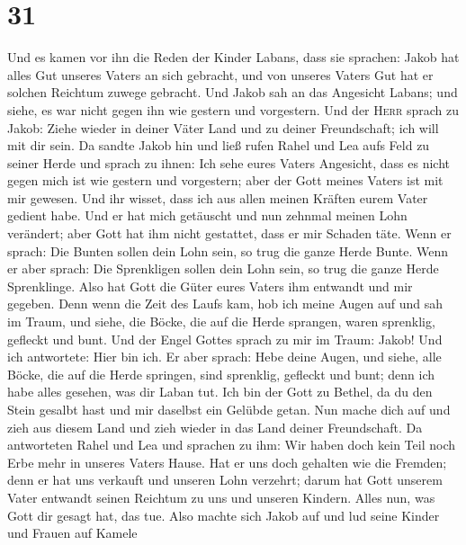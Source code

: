 \hypertarget{section-30}{%
\section{31}\label{section-30}}

 Und es kamen vor ihn die Reden der Kinder Labans, dass
sie sprachen: Jakob hat alles Gut unseres Vaters an sich gebracht, und
von unseres Vaters Gut hat er solchen Reichtum zuwege gebracht.
 Und Jakob sah an das Angesicht Labans; und siehe, es war
nicht gegen ihn wie gestern und vorgestern.  Und der
\textsc{Herr} sprach zu Jakob: Ziehe wieder in deiner Väter Land und zu
deiner Freundschaft; ich will mit dir sein.  Da sandte
Jakob hin und ließ rufen Rahel und Lea aufs Feld zu seiner Herde
 und sprach zu ihnen: Ich sehe eures Vaters Angesicht,
dass es nicht gegen mich ist wie gestern und vorgestern; aber der Gott
meines Vaters ist mit mir gewesen.  Und ihr wisset, dass
ich aus allen meinen Kräften eurem Vater gedient habe. 
Und er hat mich getäuscht und nun zehnmal meinen Lohn verändert; aber
Gott hat ihm nicht gestattet, dass er mir Schaden täte. 
Wenn er sprach: Die Bunten sollen dein Lohn sein, so trug die ganze
Herde Bunte. Wenn er aber sprach: Die Sprenkligen sollen dein Lohn sein,
so trug die ganze Herde Sprenklinge.  Also hat Gott die
Güter eures Vaters ihm entwandt und mir gegeben.  Denn
wenn die Zeit des Laufs kam, hob ich meine Augen auf und sah im Traum,
und siehe, die Böcke, die auf die Herde sprangen, waren sprenklig,
gefleckt und bunt.  Und der Engel Gottes sprach zu mir im
Traum: Jakob! Und ich antwortete: Hier bin ich.  Er aber
sprach: Hebe deine Augen, und siehe, alle Böcke, die auf die Herde
springen, sind sprenklig, gefleckt und bunt; denn ich habe alles
gesehen, was dir Laban tut.  Ich bin der Gott zu Bethel,
da du den Stein gesalbt hast und mir daselbst ein Gelübde getan. Nun
mache dich auf und zieh aus diesem Land und zieh wieder in das Land
deiner Freundschaft.  Da antworteten Rahel und Lea und
sprachen zu ihm: Wir haben doch kein Teil noch Erbe mehr in unseres
Vaters Hause.  Hat er uns doch gehalten wie die Fremden;
denn er hat uns verkauft und unseren Lohn verzehrt; 
darum hat Gott unserem Vater entwandt seinen Reichtum zu uns und unseren
Kindern. Alles nun, was Gott dir gesagt hat, das tue. 
Also machte sich Jakob auf und lud seine Kinder und Frauen auf Kamele
